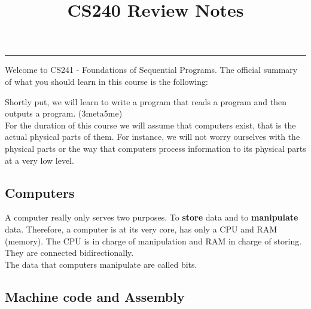 \documentclass[12pt, twoside]{article}
\title{\textbf{CS240 Review Notes}}
\begin{document}
\makeatletter
\hfil\parbox[t]{0.7\textwidth}{\centering\LARGE\bfseries\@title}\par
\kern0.5cm \hrule\kern0.5cm
\makeatother

\renewcommand{\contentsname}{Table of Contents}
\tableofcontents
\clearpage

\setlength{\oddsidemargin}{1.6cm}
\setlength{\evensidemargin}{\oddsidemargin}
\setlength{\marginparwidth}{2.6cm}
\setlength{\marginparsep}{0.25cm}

Welcome to CS241 - Foundations of Sequential Programs.  The official summary of what you should learn in this course is the following: \\


Shortly put, we will learn to write a program that reads a program and then outputs a program. (3meta5me) \\

For the duration of this course we will assume that computers exist, that is the actual physical parts of them.  For instance, we will not worry ourselves with the physical parts or the way that computers process information to its physical parts at a very low level. \\

\subsection{Computers}

A computer really only serves two purposes.  To \textbf{store} data and to \textbf{manipulate} data.  Therefore, a computer is at its very core, has only a CPU and RAM (memory).  The CPU is in charge of manipulation and RAM in charge of storing.  They are connected bidirectionally. \\

The data that computers manipulate are called bits. \\

\subsection{Machine code and Assembly}
\end{document}

